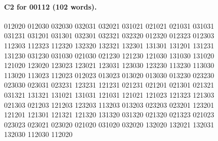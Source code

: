 \documentclass[11pt]{article}
\theoremstyle{remark}
\numberwithin{equation}{section}
\numberwithin{table}{section}
\begin{document}
\paragraph{C2 for 00112 (102 words).}
\begingroup\small\ttfamily\begin{flushleft}
012020 012030 032030 032031 032021 031021 021021 021031 031031\\
031231 031201 031301 032301 032321 032320 012320 012323 012303\\
112303 112323 112320 132320 132321 132301 131301 131201 131231\\
131230 031230 031030 021030 021230 121230 121030 131030 131020\\
121020 123020 123023 123021 123031 123030 123230 113230 113030\\
113020 113023 112023 012023 013023 013020 013030 013230 023230\\
023030 023031 023231 123231 121231 021231 021201 021301 021321\\
031321 131321 131021 131031 121031 121021 121023 121323 121303\\
021303 021203 121203 123203 113203 013203 023203 023201 123201\\
121201 121301 121321 121320 131320 031320 021320 021323 021023\\
023023 023021 023020 021020 031020 032020 132020 132021 132031\\
132030 112030 112020\\
\end{flushleft}\endgroup
\end{document}
